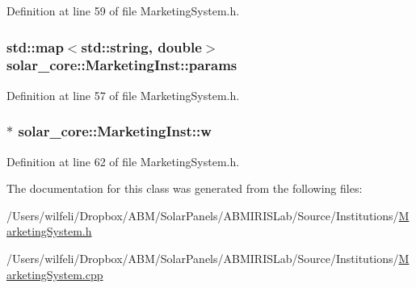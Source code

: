 Definition at line 59 of file Marketing\+System.\+h.

\hypertarget{classsolar__core_1_1_marketing_inst_a58a4f5acc2492edebfde65bee94802b9}{}
\subsubsection[{params}]{\setlength{\rightskip}{0pt plus 5cm}std\+::map$<$std\+::string, double$>$ solar\+\_\+core\+::\+Marketing\+Inst\+::params\hspace{0.3cm}{\ttfamily [protected]}}\label{classsolar__core_1_1_marketing_inst_a58a4f5acc2492edebfde65bee94802b9}


Definition at line 57 of file Marketing\+System.\+h.

\hypertarget{classsolar__core_1_1_marketing_inst_aaa4baafee95460ccda0e4b580c88e8cb}{}
\subsubsection[{w}]{$\ast$ solar\+\_\+core\+::\+Marketing\+Inst\+::w\hspace{0.3cm}{\ttfamily [protected]}}\label{classsolar__core_1_1_marketing_inst_aaa4baafee95460ccda0e4b580c88e8cb}


Definition at line 62 of file Marketing\+System.\+h.



The documentation for this class was generated from the following files\+:\begin{DoxyCompactItemize}
\item 
/\+Users/wilfeli/\+Dropbox/\+A\+B\+M/\+Solar\+Panels/\+A\+B\+M\+I\+R\+I\+S\+Lab/\+Source/\+Institutions/\hyperlink{_marketing_system_8h}{Marketing\+System.\+h}\item 
/\+Users/wilfeli/\+Dropbox/\+A\+B\+M/\+Solar\+Panels/\+A\+B\+M\+I\+R\+I\+S\+Lab/\+Source/\+Institutions/\hyperlink{_marketing_system_8cpp}{Marketing\+System.\+cpp}\end{DoxyCompactItemize}
